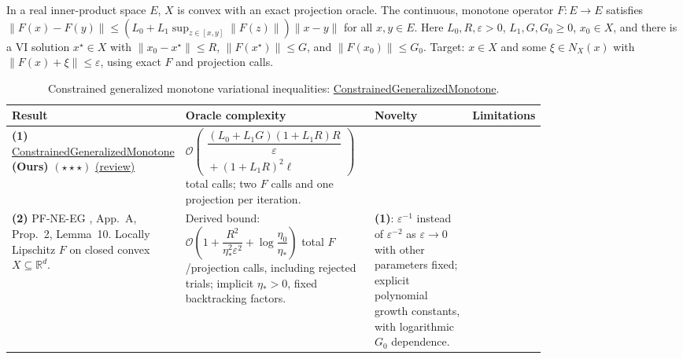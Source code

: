 \begin{table}[tp]
\centering
\caption{Constrained generalized monotone variational inequalities: \href{https://github.com/k3nfalt/longtails/blob/main/LongTails/Setups/ConstrainedGeneralizedMonotone.lean}{ConstrainedGeneralizedMonotone}.}\label{tab:ConstrainedGeneralizedMonotone}
\parbox{\linewidth}{\footnotesize In a real inner-product space $E$, $X$ is convex with an exact projection oracle. The continuous, monotone operator $F:E\to E$ satisfies $\|F(x)-F(y)\|\le (L_0+L_1\sup_{z\in[x,y]}\|F(z)\|)\|x-y\|$ for all $x,y\in E$. Here $L_0,R,\varepsilon>0$, $L_1,G,G_0\ge0$, $x_0\in X$, and there is a VI solution $x^\star\in X$ with $\|x_0-x^\star\|\le R$, $\|F(x^\star)\|\le G$, and $\|F(x_0)\|\le G_0$. Target: $x\in X$ and some $\xi\in N_X(x)$ with $\|F(x)+\xi\|\le\varepsilon$, using exact $F$ and projection calls.}\par\smallskip
\begin{threeparttable}
\footnotesize
\setlength{\tabcolsep}{4pt}\renewcommand{\arraystretch}{1.25}
\begin{tabularx}{\linewidth}{@{}>{\raggedright\arraybackslash}p{0.18\linewidth}>{\raggedright\arraybackslash}p{0.37\linewidth}>{\raggedright\arraybackslash}p{0.24\linewidth}>{\raggedright\arraybackslash}X@{}}
\toprule
\textbf{Result} & \textbf{Oracle complexity} & \textbf{Novelty} & \textbf{Limitations} \\
\midrule
\textbf{(1)} \href{https://github.com/k3nfalt/longtails/blob/main/LongTails/Theorems/ConstrainedGeneralizedMonotone.lean}{Constrained\allowbreak Generalized\allowbreak Monotone} \textbf{(Ours)} $(\star\star\star)$ \href{https://github.com/k3nfalt/longtails/blob/main/scripts/reviews/ConstrainedGeneralizedMonotone.md}{(review)}
& $\mathcal{O}\!\left(\begin{gathered}\dfrac{(L_0+L_1G)(1+L_1R)R}{\varepsilon}\\{}+(1+L_1R)^2\ell\end{gathered}\right)$ total calls; two $F$ calls and one projection per iteration. & & \\
\midrule[1.2pt]
\textbf{(2)} PF-NE-EG \citep{cgmShen2026v2}, App.~A, Prop.~2, Lemma~10. Locally Lipschitz $F$ on closed convex $X\subseteq\mathbb{R}^d$.
& Derived bound: $\mathcal{O}\!\left(1+\dfrac{R^2}{\eta_*^2\varepsilon^2}+\log\dfrac{\eta_0}{\eta_*}\right)$ total $F$/projection calls, including rejected trials; implicit $\eta_*>0$, fixed backtracking factors.
& \textbf{(1)}: $\varepsilon^{-1}$ instead of $\varepsilon^{-2}$ as $\varepsilon\to0$ with other parameters fixed; explicit polynomial growth constants, with logarithmic $G_0$ dependence.

\end{tabularx}
\end{threeparttable}
\end{table}
